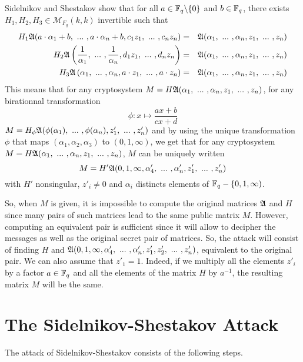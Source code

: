 \documentclass[12pt,a4paper,titlepage]{article}
\begin{document}
Sidelnikov and Shestakov show \cite{SidelShes92} that for all $a \in \mathbb{F}_q\backslash\{0\}$ and $b \in \mathbb{F}_q$, there exists $H_1, H_2, H_3 \in \mathcal{M}_{F_q}(k,k)$ invertible such that
\begin{eqnarray*}
H_1 \A(a\cdot\alpha_1 + b, \ ... \ , a\cdot \alpha_n + b, c_1z_1, \ ... \ , c_n z_n) &=& \A(\alpha_1, \ ... \ , \alpha_n, z_1, \ ... \ , z_n) \\
H_2 \A\left( \frac{1}{\alpha_1}, \ ... \ , \frac{1}{\alpha_n}, d_1z_1, \ ... \ , d_n z_n \right) &=& \A(\alpha_1, \ ... \ , \alpha_n, z_1, \ ... \ , z_n) \\
H_3 \A\left( \alpha_1, \ ... \ , \alpha_n, a\cdot z_1, \ ... \ , a\cdot z_n \right) &=& \A(\alpha_1, \ ... \ , \alpha_n, z_1, \ ... \ , z_n)
\end{eqnarray*}
This means that for any cryptosystem $M = H \A(\alpha_1, \ ... \ , \alpha_n, z_1, \ ... \ , z_n)$, for any birationnal transformation
$$ \phi : x \mapsto \frac{ax+b}{cx+d} $$
$M = H_{\phi} \mathfrak{A}(\phi(\alpha_1), \ ... \ , \phi(\alpha_n), z'_1, \ ... \ , z'_n)$ and by using the unique transformation $\phi$ that maps $(\alpha_1, \alpha_2, \alpha_3)$ to $(0,1,\infty)$, we get that for any cryptosystem $M = H \A(\alpha_1, \ ... \ , \alpha_n, z_1, \ ... \ , z_n)$, $M$ can be uniquely written
$$ M = H' \mathfrak{A}(0, 1, \infty, \alpha'_4, \ ... \ , \alpha'_n, z'_1, \ ... \ , z'_n) $$
with $H'$ nonsingular, $z'_i \neq 0$ and $\alpha_i$ distincts elements of $\mathbb{F}_q-\{0, 1, \infty)$.

So, when $M$ is given, it is impossible to compute the original matrices $\mathfrak{A}$ and $H$ since many pairs of such matrices lead to the same public matrix $M$. However, computing an equivalent pair is sufficient
since it will allow to decipher the messages as well as the original secret pair of matrices. So, the attack will consist of finding $H$ and $\mathfrak{A}(0, 1, \infty, \alpha'_4, \ ... \ , \alpha'_n, z'_1, z'_2, \ ... \ , z'_n)$, equivalent to the original pair. 
We can also assume that $z'_1=1$. Indeed, if we multiply all the elements $z'_i$ by a factor $a \in \mathbb{F}_q$ and all the elements of the matrix $H$ by $a^{-1}$, the resulting matrix $M$ will be the same.


\newpage
\section{The Sidelnikov-Shestakov Attack}
\label{sec:SSattack}

The attack of Sidelnikov-Shestakov consists of the following steps.
\bigskip
\end{document}
